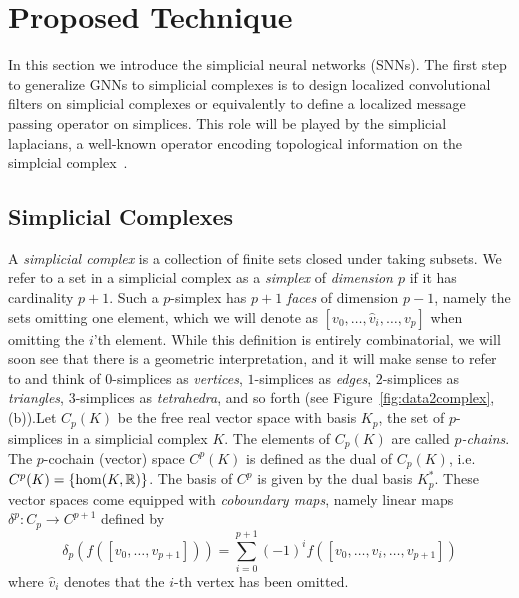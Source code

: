 \section{Proposed Technique}
In this section we introduce the simplicial neural networks (SNNs). The first step to generalize GNNs to simplicial complexes is to design localized convolutional filters on simplicial complexes or equivalently to define a localized message passing operator on simplices. This role will be played by the simplicial laplacians, a well-known operator encoding topological information on the simplcial complex~\cite{eckmann1944}. 

\subsection{Simplicial  Complexes}
A \emph{simplicial complex} is a collection of finite sets closed under taking subsets. We refer to a set in a simplicial complex as a \emph{simplex} of \emph{dimension $p$} if it has cardinality $p+1$. Such a $p$-simplex has $p+1$ \emph{faces} of dimension $p-1$, namely the sets omitting one element, which we will denote as $[v_0,\dotsc,\hat{v}_i,\dotsc, v_p]$ when omitting the $i$'th element. While this definition is entirely combinatorial, we will soon see that there is a geometric interpretation, and it will make sense to refer to and think of $0$-simplices as \emph{vertices}, $1$-simplices as \emph{edges}, $2$-simplices as \emph{triangles}, $3$-simplices as \emph{tetrahedra}, and so forth (see Figure~\ref{fig:data2complex}, (b)).Let $C_p(K)$ be the free real vector space with basis $K_p$, the set of $p$-simplices in 
a simplicial complex $K$. The elements of $C_p(K)$ are called \emph{$p$-chains}. The 
$p$-cochain (vector) space $C^p(K)$ is defined as the dual of $C_p(K)$, i.e. $C^p(K)=\{\hom(K,\mathbb{R})\}$. The basis of $C^p$ is given by the dual basis $K_p^*$. These vector spaces come equipped with \emph{coboundary maps}, namely linear maps $\delta^p:C_p\to C^{p+1}$ defined by
\begin{equation*}
\delta_p(f([v_0,\dotsc,v_{p+1}])) = \sum_{i=0}^{p+1} (-1)^i f([v_0,\dotsc,\hat{v}_i,\dotsc,v_{p+1}])
\end{equation*}
where $\hat{v}_i$ denotes that the $i$-th vertex has been omitted. 
  
